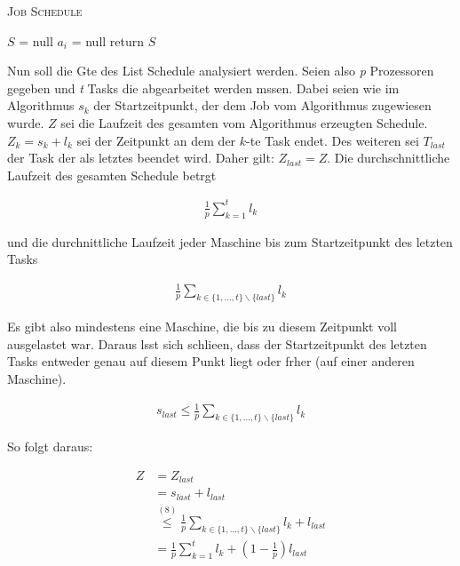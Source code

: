 \documentclass[12pt, a4paper, twoside]{scrartcl}
\begin{document}
\begin{algorithm}[h]
\caption{\textsc{Job Schedule}}
$S$ = null \;
	{$a_i$ = null\;}
return $S$\;
\end{algorithm}

Nun soll die Gte des List Schedule analysiert werden. Seien also \emph{p} Prozessoren gegeben und \emph{t} Tasks die abgearbeitet werden mssen. Dabei seien wie im Algorithmus $s_k$ der Startzeitpunkt, der dem Job vom Algorithmus zugewiesen wurde. $Z$ sei die Laufzeit des gesamten vom Algorithmus erzeugten Schedule. $Z_k = s_k + l_k$ sei der Zeitpunkt an dem der $k$-te Task endet. Des weiteren sei $T_{last}$ der Task der als letztes beendet wird. Daher gilt: $Z_{last} = Z$. Die durchschnittliche Laufzeit des gesamten Schedule betrgt

\begin{align}
	\frac{1}{p} \sum_{k = 1}^{t}  l_{k}
\end{align}

und die durchnittliche Laufzeit jeder Maschine bis zum Startzeitpunkt des letzten Tasks

\begin{align}
	\frac{1}{p} \sum_{k \in \{1,...,t\} \backslash \{last\}}  l_{k}
\end{align}

Es gibt also mindestens eine Maschine, die bis zu diesem Zeitpunkt voll ausgelastet war. Daraus lsst sich schlieen, dass der Startzeitpunkt des letzten Tasks entweder genau auf diesem Punkt liegt oder frher (auf einer anderen Maschine). 

\begin{align}
	s_{last} \leq \frac{1}{p} \sum_{k \in \{1,...,t\} \backslash \{last\}}  l_{k}
\end{align}

So folgt daraus:

\begin{align}
	Z & = Z_{last} \\
	  & = s_{last} + l_{last} \\
	  & \stackrel{\mathrm{(8)}} \leq  \frac{1}{p} \sum_{k \in \{1,...,t\} \backslash \{last\}}  l_{k} + l_{last}\\
	& = 	\frac{1}{p} \sum_{k = 1}^{t}  l_{k} + \left(1 - \frac{1}{p}\right) l_{last}\\
\end{align}
\end{document}
